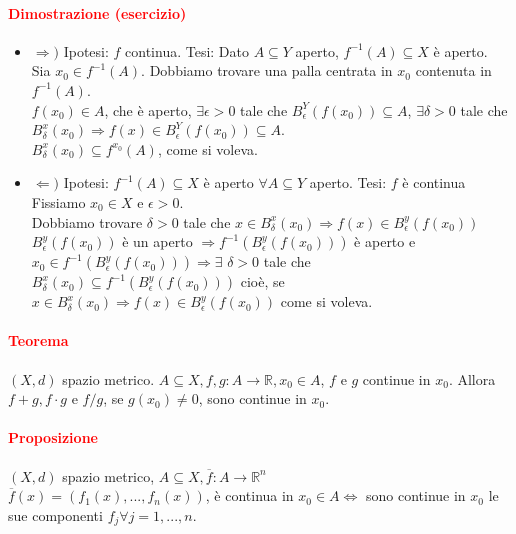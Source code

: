 \documentclass{article}
\newcommand{\R}{\mathbb{R}}
\begin{document}
\paragraph{\textcolor{red}{Dimostrazione (esercizio)}}
\begin{itemize}
    \item $\Rightarrow)$ Ipotesi: $f$ continua. Tesi: Dato $A \subseteq Y$ aperto, $f^{-1}(A)\subseteq X$ è aperto.\\
            Sia $x_0 \in f^{-1}(A)$. Dobbiamo trovare una palla centrata in $x_0$ contenuta in $f^{-1}(A)$.\\
            $f(x_0) \in A$, che è aperto, $\exists \epsilon >0$ tale che $B_{\epsilon}^{Y}(f(x_0))\subseteq A$, $\exists \delta >0 $ tale che $B_{\delta}^{x}(x_0) \Rightarrow f(x)\in B_{\epsilon}^{Y}(f(x_0))\subseteq A$.\\
            $B_{\delta}^{x}(x_0) \subseteq f^{x_0} (A)$, come si voleva.
    \item $\Leftarrow)$ Ipotesi: $f^{-1}(A)\subseteq X$ è aperto $\forall A \subseteq Y$ aperto. Tesi: $f$ è continua\\
        Fissiamo $x_0 \in X$ e $\epsilon >0$.\\
        Dobbiamo trovare $\delta >0 $ tale che $x \in B_{\delta}^{x} (x_0) \Rightarrow f(x) \in B_{\epsilon}^{y} (f(x_0))$\\
        $B_{\epsilon}^{y} (f(x_0))$ è un aperto $\Rightarrow f^{-1}(B_{\epsilon}^{y} (f(x_0)))$ è aperto e $x_0 \in f^{-1}(B_{\epsilon}^{y} (f(x_0))) \Rightarrow \exists\,\, \delta >0 $ tale che $B_{\delta}^{x}(x_0) \subseteq f^{-1}(B_{\epsilon}^{y}(f(x_0)))$ cioè, se $x \in B_{\delta}^{x}(x_0) \Rightarrow f(x) \in B_{\epsilon}^{y}(f(x_0))$ come si voleva.
\end{itemize}
\begin{flushright}
\large\Lightning
\end{flushright}

\paragraph{\textcolor{red}{Teorema}}
$(X,d)$ spazio metrico. $A \subseteq X, f,g: A \rightarrow \R, x_0 \in A$, $f$ e $g$ continue in $x_0$. Allora $f+g, f\cdot g$ e $f/g$, se $g(x_0)\neq 0$, sono continue in $x_0$.

\paragraph{\textcolor{red}{Proposizione}}
$(X,d)$ spazio metrico, $A \subseteq X, \overline{f}: A \rightarrow \R^n$\\
$\overline{f}(x)=(f_1(x),...,f_n(x))$, è continua in $x_0 \in A \Leftrightarrow$ sono continue in $x_0$ le sue componenti $f_j \forall j=1,...,n$.
\end{document}
